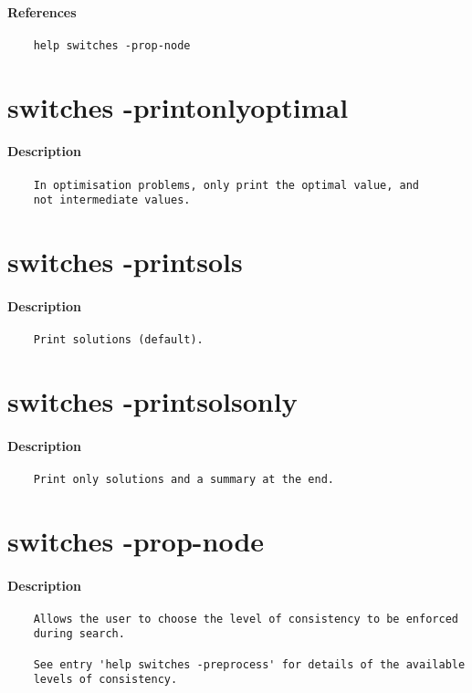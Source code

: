 \paragraph{References}
{\footnotesize
\begin{verbatim}
    help switches -prop-node
\end{verbatim}
}
\section{switches -printonlyoptimal}
\paragraph{Description}
{\footnotesize
\begin{verbatim}
    In optimisation problems, only print the optimal value, and
    not intermediate values.
\end{verbatim}
}
\section{switches -printsols}
\paragraph{Description}
{\footnotesize
\begin{verbatim}
    Print solutions (default).
\end{verbatim}
}
\section{switches -printsolsonly}
\paragraph{Description}
{\footnotesize
\begin{verbatim}
    Print only solutions and a summary at the end.
\end{verbatim}
}
\section{switches -prop-node}
\paragraph{Description}
{\footnotesize
\begin{verbatim}
    Allows the user to choose the level of consistency to be enforced
    during search.

    See entry 'help switches -preprocess' for details of the available
    levels of consistency.
\end{verbatim}
}
